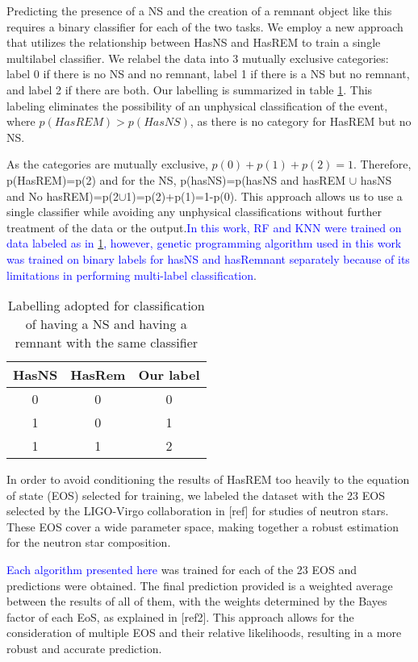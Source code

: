 Predicting the presence of a NS and the creation of a remnant object like this requires a binary classifier for each of the two tasks. We employ a new approach that utilizes the relationship between HasNS and HasREM to train a single multilabel classifier. We relabel the data into 3 mutually exclusive categories: label 0 if there is no NS and no remnant, label 1 if there is a NS but no remnant, and label 2 if there are both. Our labelling is summarized in table \ref{tab:labels}. This labeling eliminates the possibility of an unphysical classification of the event, where $p(HasREM)>p(HasNS)$, as there is no category for HasREM but no NS.

As the categories are mutually exclusive, $p(0)+p(1)+p(2)=1$. Therefore, p(HasREM)=p(2) and for the NS, p(hasNS)=p(hasNS and hasREM $\cup$ hasNS and No hasREM)=p(2$\cup$1)=p(2)+p(1)=1-p(0). This approach allows us to use a single classifier while avoiding any unphysical classifications without further treatment of the data or the output.\textcolor{blue}{In this work, RF and KNN were trained on data labeled as in \ref{tab:labels}, however, genetic programming algorithm used in this work was trained on binary labels for hasNS and hasRemnant separately because of its limitations in performing multi-label classification}.

\begin{table}[h]
\centering
\begin{tabular}{@{}ccc@{}}
\toprule
HasNS & HasRem & Our label \\ \midrule
0     & 0      & 0         \\
1     & 0      & 1         \\
1     & 1      & 2         \\ \bottomrule
\end{tabular}
\caption{Labelling adopted for classification of having a NS and having a remnant with the same classifier}
\label{tab:labels}
\end{table}

In order to avoid conditioning the results of HasREM too heavily to the equation of state (EOS) selected for training, we labeled the dataset with the 23 EOS selected by the LIGO-Virgo collaboration in [ref] for studies of neutron stars. These EOS cover a wide parameter space, making together a robust estimation for the neutron star composition.

\textcolor{blue}{Each algorithm presented here} was trained for each of the 23 EOS and predictions were obtained. The final prediction provided is a weighted average between the results of all of them, with the weights determined by the Bayes factor of each EoS, as explained in [ref2]. This approach allows for the consideration of multiple EOS and their relative likelihoods, resulting in a more robust and accurate prediction.

